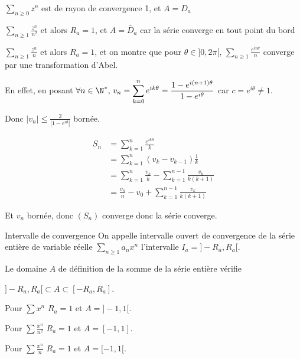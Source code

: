 \begin{exemple}
    $\sum_{n \geqslant 0} z^n$ est de rayon de convergence 1, et $A = D_a$

    \lvspace $\sum_{n \geqslant 1} \frac{z^n }{n^2 }$ et alors $R_a = 1$, et $A = \bar D_a$ car la série converge en tout point du bord

    \lvspace $\sum_{n \geqslant 1} \frac{z^n }{n }$ et alors $R_a = 1$, et on montre que pour 
    $\theta \in ]0, 2 \pi[, \, \sum_{n \geqslant 1} \frac{e^{i n \theta}}{n}$ converge par une transformation d'Abel.

    En effet, en posant $\forall n \in \N^*, \, v_n = \displaystyle \sum_{k = 0 }^{n } e^{i k \theta} = \frac{1 - e^{i (n + 1) \theta}}{1 - e^{i \theta}}$
    car $c = e^{i \theta} \neq 1$. 
    
    Donc $\displaystyle \left| v_n \right| \leqslant \frac 2 {\left| 1 - e ^{i \theta} \right|}$ bornée.

    \begin{align}
        S_n & = \sum_{k = 1}^n \frac{e^{i k \theta}}{k} \\
        & = \sum_{k = 1}^n \left( v_k - v_{k - 1} \right) \frac 1 k \\
        & = \sum_{k = 1}^{n} \frac{v_k} k - \sum_{k = 1}^{n - 1} \frac{v_k}{k(k + 1)}\\
        & = \frac{v_n} n - v_0 + \sum_{k = 1}^{n - 1} \frac{v_k}{k(k + 1)} 
    \end{align}

    Et $v_n$ bornée, donc $(S_n)$ converge donc la série converge. 
\end{exemple}

\begin{definition}{Intervalle de convergence}{}
    On appelle intervalle ouvert de convergence de la série entière de variable 
    réelle $\sum_{n \geqslant 1} a_n x^n$ l'intervalle $I_a = ]-R_a, R_a[$.

    Le domaine $A$ de définition de la somme de la série entière vérifie 
    
    $] - R_a, R_a [ \subset A \subset [ - R_a, R_a ]$.
\end{definition}

\begin{exemple}
    Pour $\displaystyle \sum x^n$ $R_a = 1$ et $A = ]-1, 1[$.

    \lvspace Pour $\displaystyle \sum \frac{x^n}{n^2}$ $R_a = 1$ et $A = [ -1, 1 ]$.

    \lvspace Pour $\displaystyle \sum \frac{x^n}{n}$ $R_a = 1$ et $A = [ -1, 1 [ $.
\end{exemple}


